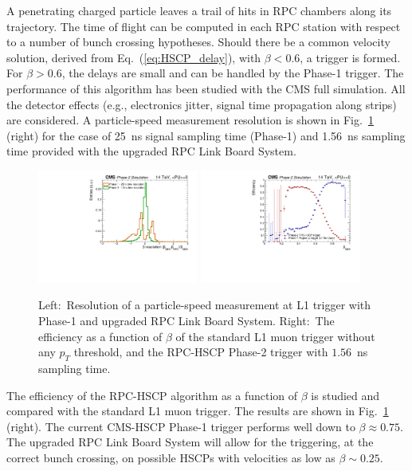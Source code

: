 A penetrating charged particle leaves a trail of hits in RPC chambers along its trajectory. The time of flight can be computed in each RPC station with respect to a number of bunch crossing hypotheses. Should there be a common velocity solution, derived from Eq.~(\ref{eq:HSCP_delay}), with $\beta < 0.6$, a trigger is formed. For $\beta >0.6$, the delays are small and can be handled by the Phase-1 trigger. The performance of this algorithm has been studied with the CMS full simulation. All the detector effects (e.g., electronics jitter, signal time propagation along strips) are considered. A particle-speed measurement resolution is shown in Fig.~\ref{fig:HCP_Trigger} (right) for the case of 25~ns signal sampling time (Phase-1) and 1.56~ns sampling time provided with the upgraded RPC Link Board System.

\begin{figure}[t]
\begin{center}
  \includegraphics[width=0.47\textwidth]{figures/HSCP/beta_GenRes_2.pdf} \hfill
  \includegraphics[width=0.47\textwidth]{figures/HSCP/trigEff-Mu-HSCPTriggers.pdf}
  \caption{Left:~Resolution of a particle-speed measurement at L1 trigger with Phase-1 and upgraded RPC Link Board System. Right:~The efficiency as a function of $\beta$ of the standard L1 muon trigger without any $p_T$ threshold, and the RPC-HSCP Phase-2 trigger with $1.56$~ns sampling time.}
  \label{fig:HCP_Trigger}
\end{center}
\end{figure}

The efficiency of the RPC-HSCP algorithm as a function of $\beta$ is studied and compared with the standard L1 muon trigger. The results are shown in Fig.~\ref{fig:HCP_Trigger} (right). The current CMS-HSCP Phase-1 trigger performs well down to $\beta \approx 0.75$. The upgraded RPC Link Board System will allow for the triggering, at the
correct bunch crossing, on possible HSCPs with velocities as low as $\beta \sim 0.25$.

